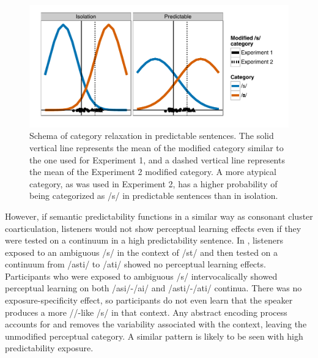 \begin{figure}[!ht]
\centering
\caption{Schema of category relaxation in predictable sentences.  The solid vertical line represents the mean of the modified category similar to the one used for Experiment 1, and a dashed vertical line represents the mean of the Experiment 2 modified category.  A more atypical category, as was used in Experiment 2, has a higher probability of being categorized as /s/ in predictable sentences than in isolation.}
\label{fig:distPred}
\begin{center}
\includegraphics[width=\textwidth]{graphs/distPred}
\end{center}
\end{figure}

However, if semantic predictability functions in a similar way as consonant cluster coarticulation, listeners would not show perceptual learning effects even if they were tested on a continuum in a high predictability sentence.
In \citet{Kraljic2008a}, listeners exposed to an ambiguous /s/ in the context of /st\textturnr/ and then tested on a continuum from /ast\textturnr i/ to /a\textesh t\textturnr i/ showed no perceptual learning effects.
Participants who were exposed to ambiguous /s/ intervocalically showed perceptual learning on both /asi/-/a\textesh i/ and /ast\textturnr i/-/a\textesh t\textturnr i/ continua.
There was no exposure-specificity effect, so participants do not even learn that the speaker produces a more /\textesh/-like /s/ in that context.
Any abstract encoding process accounts for and removes the variability associated with the context, leaving the unmodified perceptual category.
A similar pattern is likely to be seen with high predictability exposure.

